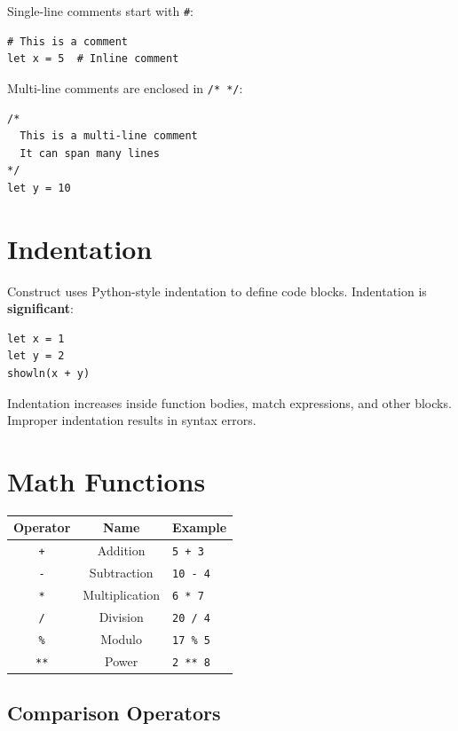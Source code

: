 \documentclass[11pt,twoside,openright]{book}
\begin{document}
Single-line comments start with \texttt{\#}:

\begin{lstlisting}[language=ConstructLang]
# This is a comment
let x = 5  # Inline comment
\end{lstlisting}

Multi-line comments are enclosed in \texttt{/* */}:

\begin{lstlisting}[language=ConstructLang]
/*
  This is a multi-line comment
  It can span many lines
*/
let y = 10
\end{lstlisting}

\section{Indentation}

Construct uses Python-style indentation to define code blocks. Indentation is \textbf{significant}:

\begin{lstlisting}[language=ConstructLang]
let x = 1
let y = 2
showln(x + y)
\end{lstlisting}

Indentation increases inside function bodies, match expressions, and other blocks. Improper indentation results in syntax errors.

\section{Math Functions}

\begin{center}
\begin{tabular}{|c|c|l|}
\hline
\textbf{Operator} & \textbf{Name} & \textbf{Example} \\
\hline
\texttt{+} & Addition & \texttt{5 + 3} \\
\texttt{-} & Subtraction & \texttt{10 - 4} \\
\texttt{*} & Multiplication & \texttt{6 * 7} \\
\texttt{/} & Division & \texttt{20 / 4} \\
\texttt{\%} & Modulo & \texttt{17 \% 5} \\
\texttt{**} & Power & \texttt{2 ** 8} \\
\hline
\end{tabular}
\end{center}

\subsection{Comparison Operators}
\end{document}
